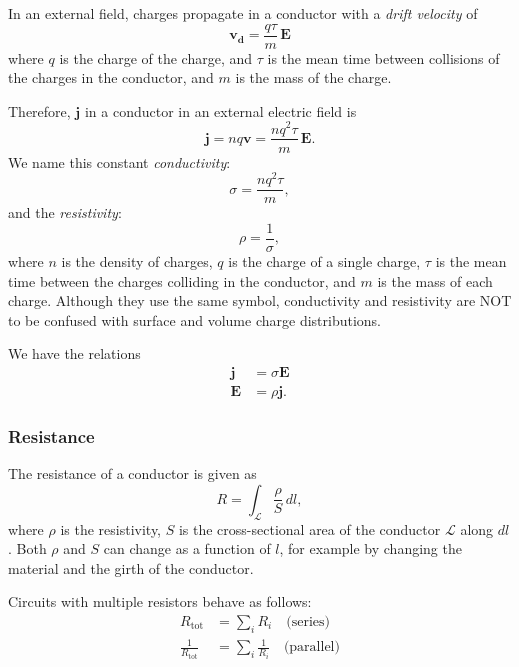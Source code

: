\documentclass[a4paper, 12pt]{article}
\renewcommand{\vec}[1]{\bm{#1}}
\newcommand{\E}{\ensuremath{\vec{E}}}
\renewcommand{\j}{\ensuremath{\vec{j}}}
\begin{document}
        In an external field, charges propagate in a conductor with a \textit{drift velocity} of
        \begin{equation}
            \vec{v_d} = \frac{q\tau}{m}\,\E
        \end{equation}
        where $q$ is the charge of the charge, and $\tau$ is the mean time between collisions of the charges in the conductor, 
        and $m$ is the mass of the charge.
        
        Therefore, $\j$ in a conductor in an external electric field is
        \begin{equation}
            \j = nq\vec{v} = \frac{nq^2\tau}{m}\,\E.
        \end{equation}
        We name this constant \textit{conductivity}: 
        \begin{equation}
            \sigma = \frac{nq^2\tau}{m},
        \end{equation}
        and the \textit{resistivity}:
        \begin{equation}
            \rho = \frac{1}{\sigma},
        \end{equation}
        where $n$ is the density of charges, $q$ is the charge of a single charge, 
        $\tau$ is the mean time between the charges colliding in the conductor, and $m$ is the mass of each charge. 
        Although they use the same symbol, conductivity and resistivity are NOT to be confused with surface and volume charge distributions.
        
        We have the relations 
        \begin{align}
            \j &= \sigma \E \\
            \E &= \rho \j.
        \end{align}
    
    \subsubsection{Resistance}
        The resistance of a conductor is given as
        \begin{equation}
            R = \int_\mathcal{L} \frac{\rho}{S}\, dl,
        \end{equation}
        where $\rho$ is the resistivity, 
        $S$ is the cross-sectional area of the conductor $\mathcal{L}$ along $dl$. 
        Both $\rho$ and $S$ can change as a function of $l$, for example by changing the material and the girth of the conductor.
        
        Circuits with multiple resistors behave as follows: 
        \begin{align}
            R_{\text{tot}} &= \sum_i R_i\quad \text{(series)} \\
            \frac{1}{R_{\text{tot}}} &= \sum_i \frac{1}{R_i} \quad\text{(parallel)}
        \end{align}
        
\end{document}
